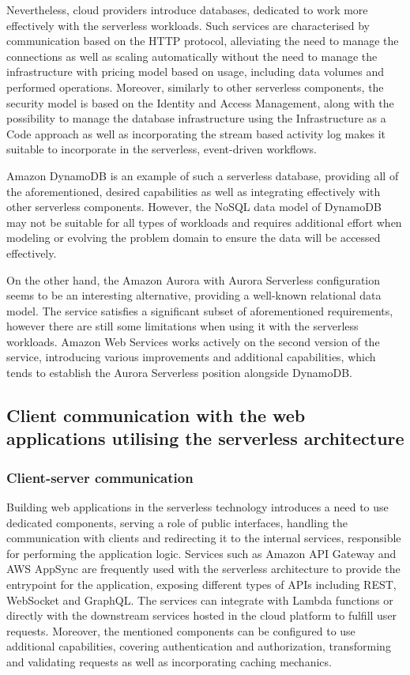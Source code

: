 Nevertheless, cloud providers introduce databases, dedicated to work more effectively with the serverless workloads.
Such services are characterised by communication based on the HTTP protocol, alleviating the need to manage the connections as well as scaling automatically without the need to manage the infrastructure with pricing model based on usage, including data volumes and performed operations.
Moreover, similarly to other serverless components, the security model is based on the Identity and Access Management, along with the possibility to manage the database infrastructure using the Infrastructure as a Code approach as well as incorporating the stream based activity log makes it suitable to incorporate in the serverless, event-driven workflows.

Amazon DynamoDB is an example of such a serverless database, providing all of the aforementioned, desired capabilities as well as integrating effectively with other serverless components.
However, the NoSQL data model of DynamoDB may not be suitable for all types of workloads and requires additional effort when modeling or evolving the problem domain to ensure the data will be accessed effectively.

On the other hand, the Amazon Aurora with Aurora Serverless configuration seems to be an interesting alternative, providing a well-known relational data model.
The service satisfies a significant subset of aforementioned requirements, however there are still some limitations when using it with the serverless workloads.
Amazon Web Services works actively on the second version of the service, introducing various improvements and additional capabilities, which tends to establish the Aurora Serverless position alongside DynamoDB.

\subsection{Client communication with the web applications utilising the serverless architecture}

\subsubsection{Client-server communication}

Building web applications in the serverless technology introduces a need to use dedicated components, serving a role of public interfaces, handling the communication with clients and redirecting it to the internal services, responsible for performing the application logic.
Services such as Amazon API Gateway and AWS AppSync are frequently used with the serverless architecture to provide the entrypoint for the application, exposing different types of APIs including REST, WebSocket and GraphQL.
The services can integrate with Lambda functions or directly with the downstream services hosted in the cloud platform to fulfill user requests. 
Moreover, the mentioned components can be configured to use additional capabilities, covering authentication and authorization, transforming and validating requests as well as incorporating caching mechanics.

